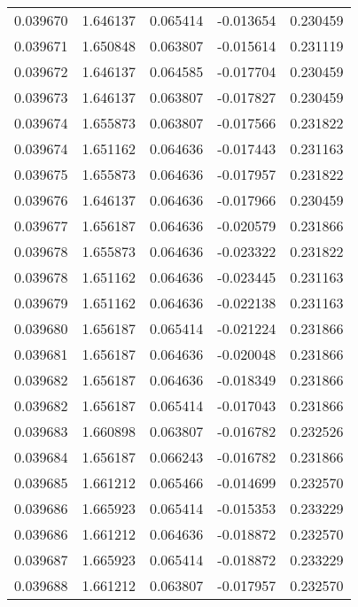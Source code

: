 \begin{tabular}{lrrrr}
0.039670    &  1.646137 &  0.065414 & -0.013654 &             0.230459 \\
0.039671    &  1.650848 &  0.063807 & -0.015614 &             0.231119 \\
0.039672    &  1.646137 &  0.064585 & -0.017704 &             0.230459 \\
0.039673    &  1.646137 &  0.063807 & -0.017827 &             0.230459 \\
0.039674    &  1.655873 &  0.063807 & -0.017566 &             0.231822 \\
0.039674    &  1.651162 &  0.064636 & -0.017443 &             0.231163 \\
0.039675    &  1.655873 &  0.064636 & -0.017957 &             0.231822 \\
0.039676    &  1.646137 &  0.064636 & -0.017966 &             0.230459 \\
0.039677    &  1.656187 &  0.064636 & -0.020579 &             0.231866 \\
0.039678    &  1.655873 &  0.064636 & -0.023322 &             0.231822 \\
0.039678    &  1.651162 &  0.064636 & -0.023445 &             0.231163 \\
0.039679    &  1.651162 &  0.064636 & -0.022138 &             0.231163 \\
0.039680    &  1.656187 &  0.065414 & -0.021224 &             0.231866 \\
0.039681    &  1.656187 &  0.064636 & -0.020048 &             0.231866 \\
0.039682    &  1.656187 &  0.064636 & -0.018349 &             0.231866 \\
0.039682    &  1.656187 &  0.065414 & -0.017043 &             0.231866 \\
0.039683    &  1.660898 &  0.063807 & -0.016782 &             0.232526 \\
0.039684    &  1.656187 &  0.066243 & -0.016782 &             0.231866 \\
0.039685    &  1.661212 &  0.065466 & -0.014699 &             0.232570 \\
0.039686    &  1.665923 &  0.065414 & -0.015353 &             0.233229 \\
0.039686    &  1.661212 &  0.064636 & -0.018872 &             0.232570 \\
0.039687    &  1.665923 &  0.065414 & -0.018872 &             0.233229 \\
0.039688    &  1.661212 &  0.063807 & -0.017957 &             0.232570 \\

\end{tabular}
